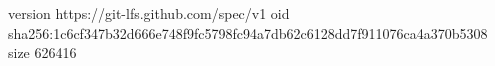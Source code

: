 version https://git-lfs.github.com/spec/v1
oid sha256:1c6cf347b32d666e748f9fc5798fc94a7db62c6128dd7f911076ca4a370b5308
size 626416
